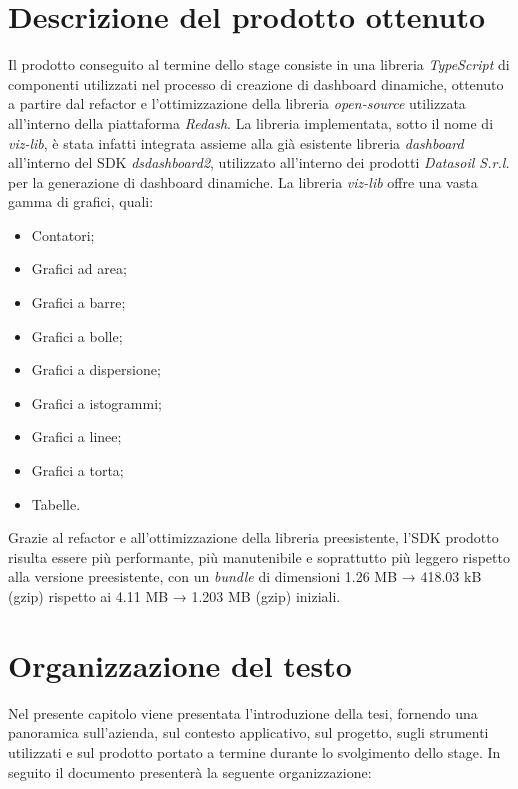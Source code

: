 \section{Descrizione del prodotto ottenuto}
Il prodotto conseguito al termine dello stage consiste in una libreria \textit{TypeScript} di componenti utilizzati nel processo di creazione di dashboard dinamiche,
ottenuto a partire dal refactor e l'ottimizzazione della libreria \textit{open-source} utilizzata all'interno della piattaforma \textit{Redash}.
La libreria implementata, sotto il nome di \textit{viz-lib}, è stata infatti integrata assieme alla già esistente libreria \textit{dashboard} all'interno del SDK
\textit{dsdashboard2}, utilizzato all'interno dei prodotti \textit{Datasoil S.r.l.} per la generazione di dashboard dinamiche.
La libreria \textit{viz-lib} offre una vasta gamma di grafici, quali:
\begin{itemize}
      \item Contatori;
      \item Grafici ad area;
      \item Grafici a barre;
      \item Grafici a bolle;
      \item Grafici a dispersione;
      \item Grafici a istogrammi;
      \item Grafici a linee;
      \item Grafici a torta;
      \item Tabelle.
\end{itemize}
Grazie al refactor e all'ottimizzazione della libreria preesistente, l'SDK prodotto risulta essere più performante, più manutenibile e soprattutto più leggero rispetto
alla versione preesistente, con un \textit{bundle} di dimensioni 1.26 MB → 418.03 kB (gzip) rispetto ai 4.11 MB → 1.203 MB (gzip) iniziali.

\section{Organizzazione del testo}
Nel presente capitolo viene presentata l'introduzione della tesi, fornendo una panoramica sull'azienda, sul contesto applicativo,
sul progetto, sugli strumenti utilizzati e sul prodotto portato a termine durante lo svolgimento dello stage. \newline
In seguito il documento presenterà la seguente organizzazione:

